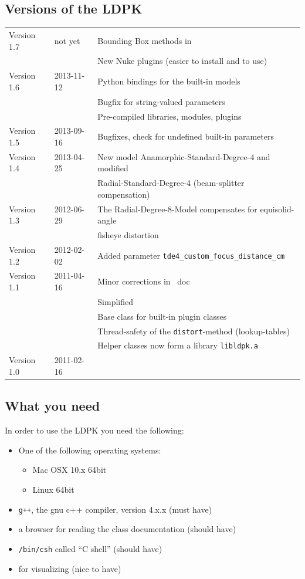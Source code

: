 \documentclass[10pt,a4paper]{article}
\begin{document}
\subsection{Versions of the LDPK}
\begin{tabular}{lll}
Version 1.7	& not yet	& Bounding Box methods in \ldpk{\tt ldp\_builtin}\\
		&		& New Nuke plugins (easier to install and to use)\\
Version 1.6	& 2013-11-12	& Python bindings for the built-in models\\
		&		& Bugfix for string-valued parameters\\
		&		& Pre-compiled libraries, modules, plugins\\
Version 1.5	& 2013-09-16	& Bugfixes, check for undefined built-in parameters\\
Version 1.4	& 2013-04-25	& New model Anamorphic-Standard-Degree-4 and modified\\
		&		& Radial-Standard-Degree-4 (beam-splitter compensation)\\
Version 1.3	& 2012-06-29	& The Radial-Degree-8-Model compensates for equisolid-angle\\
		&		& fisheye distortion\\
Version 1.2	& 2012-02-02	& Added parameter {\tt tde4\_custom\_focus\_distance\_cm}\\
Version 1.1	& 2011-04-16	& Minor corrections in \doxygen\ doc\\
		&		& Simplified \ldpk{\tt/classic\_3de\_mixed\_distortion}\\
		&		& Base class for built-in plugin classes\\
		&		& Thread-safety of the {\tt distort}-method (lookup-tables)\\
		&		& Helper classes now form a library \tt{libldpk.a}\\
Version 1.0	& 2011-02-16\\
\end{tabular}
\subsection{What you need}
In order to use the LDPK you need the following:
\begin{itemize}
\item One of the following operating systems:
\begin{itemize}
\item Mac OSX 10.x 64bit
\item Linux 64bit
\end{itemize}
\item {\tt g++}, the gnu c++ compiler, version 4.x.x (must have)
\item a browser for reading the class documentation (should have)
\item {\tt /bin/csh} called ``C shell'' (should have)
\item {\tt \gnuplot} for visualizing (nice to have)
\end{itemize}
%
\end{document}
